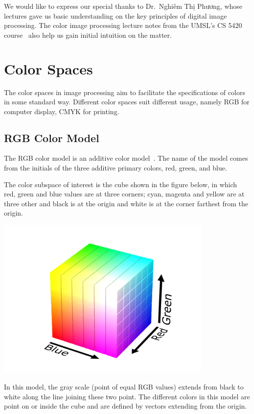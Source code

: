 \documentclass[a4paper,12pt]{article}
\begin{document}
We would like to express our special thanks to Dr.~Nghiêm Thị Phương,
whose lectures gave us basic understanding on the key principles of
digital image processing.  The color image processing lecture notes from
the UMSL's CS 5420 course~\cite{cs5420} also help us gain initial intuition
on the matter.

\section{Color Spaces}
The color spaces in image processing aim to facilitate the specifications of
colors in some standard way.  Different color spaces suit different usage,
namely RGB for computer display, CMYK for printing.

\subsection{RGB Color Model}
The RGB color model is an additive color model~\cite{rgb}.  The name of
the model comes from the initials of the three additive primary colors,
red, green, and blue.

The color subspace of interest is the cube shown in the figure below, in which
red, green and blue values are at three corners; cyan, magenta and yellow are
at three other and black is at the origin and white is at the corner farthest
from the origin.
\begin{center}
  \includegraphics[width=0.80\textwidth]{rgb.png}
\end{center}

In this model, the gray scale (point of equal RGB values) extends from black
to white along the line joining these two point.  The different colors in
this model are point on or inside the cube and are defined by vectors extending
from the origin.
\end{document}
